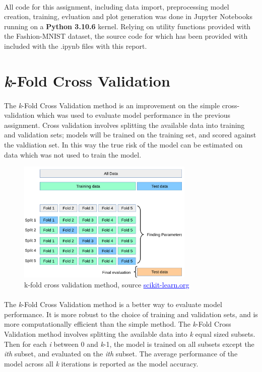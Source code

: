 \documentclass[12pt, letterpaper]{article}
\begin{document}
\paragraph*{}All code for this assignment, including data import, preprocessing
model creation, training, evluation and plot generation was done in Jupyter
Notebooks running on a \textbf{Python 3.10.6} kernel. Relying on utility
functions provided with the Fashion-MNIST dataset, the source code for which
has been provided with included with the .ipynb files with this report.

\section{\textit{k}-Fold Cross Validation}

\paragraph*{}The \textit{k}-Fold Cross Validation method is an improvement
on the simple cross-validation which was used to evaluate model performance
in the previous assignment. Cross validation involves splitting the available
data into training and validation sets; models will be trained on the training
set, and scored against the valdiation set. In this way the true risk of the
model can be estimated on data which was not used to train the model.

\begin{figure}[ht]
    \centering
    \includegraphics[width=0.75\textwidth]{0.png}
    \caption{k-fold cross validation method, source \href{https://scikit-learn.org/stable/modules/cross_validation.html}{\textcolor{blue}{\underline{scikit-learn.org}}}}
    \label{fig:1}
\end{figure}

\paragraph*{}The \textit{k}-Fold Cross Validation method is a better way to
evaluate model performance. It is more robust to the choice of training and
validation sets, and is more computationally efficient than the simple
method. The \textit{k}-Fold Cross Validation method involves splitting the
available data into \textit{k} equal sized subsets. Then for each \textit{i}
between 0 and \textit{k}-1, the model is trained on all subsets except the
\textit{ith} subset, and evaluated on the \textit{ith} subset. The average
performance of the model across all \textit{k} iterations is reported as the
model accuracy. 
\end{document}
